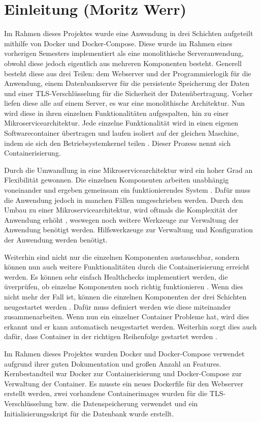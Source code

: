 \chapter{Einleitung (Moritz Werr)}

\nocite{*}

Im Rahmen dieses Projektes wurde eine Anwendung in drei Schichten aufgeteilt mithilfe von Docker und Docker-Compose. Diese wurde im Rahmen eines vorherigen Semesters implementiert als eine monolithische Serveranwendung, obwohl diese jedoch eigentlich aus mehreren Komponenten besteht. Generell besteht diese aus drei Teilen: dem Webserver und der Programmierlogik für die Anwendung, einem Datenbankserver für die persistente Speicherung der Daten und einer TLS-Verschlüsselung für die Sicherheit der Datenübertragung. Vorher liefen diese alle auf einem Server, es war eine monolithische Architektur. Nun wird diese in ihren einzelnen Funktionalitäten aufgespalten, hin zu einer Mikroservicearchitektur. Jede einzelne Funktionalität wird in einen eigenen Softwarecontainer übertragen und laufen isoliert auf der gleichen Maschine, indem sie sich den Betriebsystemkernel teilen \cite[Vgl. S. 152444]{watada_emerging_2019}. Dieser Prozess nennt sich Containerisierung.

Durch die Umwandlung in eine Mikroservicearchitektur wird ein hoher Grad an Flexibilität gewonnen. Die einzelnen Komponenten arbeiten unabhängig voneinander und ergeben gemeinsam ein funktionierendes System \cite[Vgl. S.1f]{fowler_microservices_2015}. Dafür muss die Anwendung jedoch in manchen Fällen  umgeschrieben werden. Durch den Umbau zu einer Mikroservicearchitektur, wird oftmals die Komplexität der Anwendung erhöht \cite[Vgl. S.10]{su_modular_2024}, weswegen noch weitere Werkzeuge zur Verwaltung der Anwendung benötigt werden. Hilfswerkzeuge zur Verwaltung und Konfiguration der Anwendung werden benötigt. 

Weiterhin sind nicht nur die einzelnen Komponenten austauschbar, sondern können nun auch weitere Funktionalitäten durch die Containerisierung erreicht werden. Es können sehr einfach Healthchecks implementiert werden, die üverprüfen, ob einzelne Komponenten noch richtig funktionieren \cite{noauthor_services_0100}. Wenn dies nicht mehr der Fall ist, können die einzelnen Komponenten der drei Schichten neugestartet werden \cite{noauthor_services_0100}. Dafür muss definiert werden wie diese miteinander zusammenarbeiten. Wenn nun ein einzelner Container Probleme hat, wird dies erkannt und er kann automatisch neugestartet werden. Weiterhin sorgt dies auch dafür, dass Container in der richtigen Reihenfolge gestartet werden \cite{noauthor_services_0100}.

Im Rahmen dieses Projektes wurden Docker und Docker-Compose verwendet aufgrund ihrer guten Dokumentation und großen Anzahl an Features. Kernbestandteil war Docker zur Containerisierung und Docker-Compose zur Verwaltung der Container. Es musste ein neues Dockerfile für den Webserver erstellt werden, zwei vorhandene Containerimages wurden für die TLS-Verschlüsselung bzw. die Datenspeicherung verwendet und ein Initialisierungsskript für die Datenbank wurde erstellt.